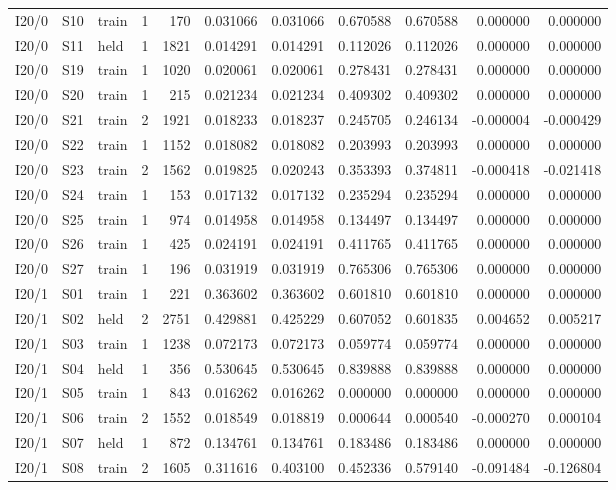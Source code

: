 \documentclass[10pt,a4paper]{article}
\begin{document}
{{\begin{longtable}{@{}lllrrrrrrrr@{}}
I20/0 & S10 & train & 1 & 170 & 0.031066 & 0.031066 & 0.670588 & 0.670588 & 0.000000 & 0.000000 \\
I20/0 & S11 & held & 1 & 1821 & 0.014291 & 0.014291 & 0.112026 & 0.112026 & 0.000000 & 0.000000 \\
I20/0 & S19 & train & 1 & 1020 & 0.020061 & 0.020061 & 0.278431 & 0.278431 & 0.000000 & 0.000000 \\
I20/0 & S20 & train & 1 & 215 & 0.021234 & 0.021234 & 0.409302 & 0.409302 & 0.000000 & 0.000000 \\
I20/0 & S21 & train & 2 & 1921 & 0.018233 & 0.018237 & 0.245705 & 0.246134 & -0.000004 & -0.000429 \\
I20/0 & S22 & train & 1 & 1152 & 0.018082 & 0.018082 & 0.203993 & 0.203993 & 0.000000 & 0.000000 \\
I20/0 & S23 & train & 2 & 1562 & 0.019825 & 0.020243 & 0.353393 & 0.374811 & -0.000418 & -0.021418 \\
I20/0 & S24 & train & 1 & 153 & 0.017132 & 0.017132 & 0.235294 & 0.235294 & 0.000000 & 0.000000 \\
I20/0 & S25 & train & 1 & 974 & 0.014958 & 0.014958 & 0.134497 & 0.134497 & 0.000000 & 0.000000 \\
I20/0 & S26 & train & 1 & 425 & 0.024191 & 0.024191 & 0.411765 & 0.411765 & 0.000000 & 0.000000 \\
I20/0 & S27 & train & 1 & 196 & 0.031919 & 0.031919 & 0.765306 & 0.765306 & 0.000000 & 0.000000 \\
I20/1 & S01 & train & 1 & 221 & 0.363602 & 0.363602 & 0.601810 & 0.601810 & 0.000000 & 0.000000 \\
I20/1 & S02 & held & 2 & 2751 & 0.429881 & 0.425229 & 0.607052 & 0.601835 & 0.004652 & 0.005217 \\
I20/1 & S03 & train & 1 & 1238 & 0.072173 & 0.072173 & 0.059774 & 0.059774 & 0.000000 & 0.000000 \\
I20/1 & S04 & held & 1 & 356 & 0.530645 & 0.530645 & 0.839888 & 0.839888 & 0.000000 & 0.000000 \\
I20/1 & S05 & train & 1 & 843 & 0.016262 & 0.016262 & 0.000000 & 0.000000 & 0.000000 & 0.000000 \\
I20/1 & S06 & train & 2 & 1552 & 0.018549 & 0.018819 & 0.000644 & 0.000540 & -0.000270 & 0.000104 \\
I20/1 & S07 & held & 1 & 872 & 0.134761 & 0.134761 & 0.183486 & 0.183486 & 0.000000 & 0.000000 \\
I20/1 & S08 & train & 2 & 1605 & 0.311616 & 0.403100 & 0.452336 & 0.579140 & -0.091484 & -0.126804 \\

\end{longtable}}}
\end{document}
